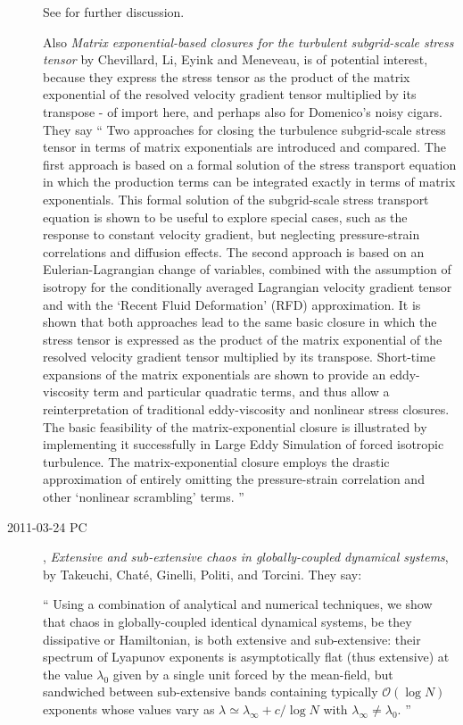 \begin{description}
See  for further discussion.

Also \emph{Matrix exponential-based closures for 		the turbulent
subgrid-scale stress tensor} by Chevillard, Li, Eyink and  Meneveau, is
of potential interest, because they express the stress tensor as the
product of the matrix exponential of the resolved velocity gradient
tensor multiplied by its transpose - of import here, and perhaps also for
Domenico's noisy cigars. They say ``
Two approaches for closing the turbulence subgrid-scale stress tensor in
terms of matrix exponentials are introduced and compared. The first
approach is based on a formal solution of the stress transport equation
in which the production terms can be integrated exactly in terms of
matrix exponentials. This formal solution of the subgrid-scale stress
transport equation is shown to be useful to explore special cases, such
as the response to constant velocity gradient, but neglecting
pressure-strain correlations and diffusion effects. The second approach
is based on an Eulerian-Lagrangian change of variables, combined with the
assumption of isotropy for the conditionally averaged Lagrangian velocity
gradient tensor and with the `Recent Fluid Deformation' (RFD)
approximation. It is shown that both approaches lead to the same basic
closure in which the stress tensor is expressed as the product of the
matrix exponential of the resolved velocity gradient tensor multiplied by
its transpose. Short-time expansions of the matrix exponentials are shown
to provide an eddy-viscosity term and particular quadratic terms, and
thus allow a reinterpretation of traditional eddy-viscosity and nonlinear
stress closures. The basic feasibility of the matrix-exponential closure
is illustrated by implementing it successfully in Large Eddy Simulation
of forced isotropic turbulence. The matrix-exponential closure employs
the drastic approximation of entirely omitting the pressure-strain
correlation and other `nonlinear scrambling' terms.
''

\item[2011-03-24 PC] ,
\emph{Extensive and sub-extensive chaos in globally-coupled dynamical systems},
by Takeuchi, Chat\'e, Ginelli, Politi, and Torcini. They say:

``
Using a combination of analytical and numerical techniques, we show that
chaos in globally-coupled identical dynamical systems, be they
dissipative or Hamiltonian, is both extensive and sub-extensive: their
spectrum of Lyapunov exponents is asymptotically flat (thus extensive) at
the value $\lambda_0$ given by a single unit forced by the mean-field,
but sandwiched between sub-extensive bands containing typically
$\mathcal{O}(\log N)$ exponents whose values vary as $\lambda \simeq
\lambda_\infty + c/\log N$ with $\lambda_\infty \neq \lambda_0$.
''


\end{description}
